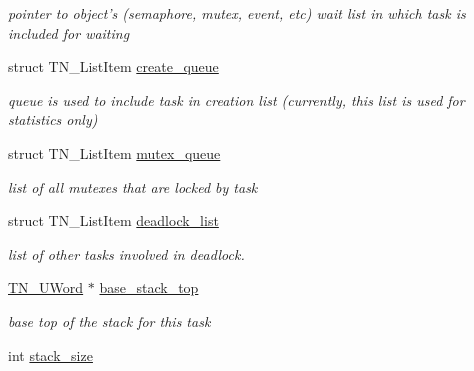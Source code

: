 \begin{DoxyCompactItemize}
\begin{DoxyCompactList}\small\item\em pointer to object's (semaphore, mutex, event, etc) wait list in which task is included for waiting \end{DoxyCompactList}\item 
\hypertarget{structTN__Task_aedb23df723d259530f10a122fec42334}{struct T\+N\+\_\+\+List\+Item \hyperlink{structTN__Task_aedb23df723d259530f10a122fec42334}{create\+\_\+queue}}\label{structTN__Task_aedb23df723d259530f10a122fec42334}

\begin{DoxyCompactList}\small\item\em queue is used to include task in creation list (currently, this list is used for statistics only) \end{DoxyCompactList}\item 
\hypertarget{structTN__Task_ad4decd7355c95a5b60a6774c3ee19eb9}{struct T\+N\+\_\+\+List\+Item \hyperlink{structTN__Task_ad4decd7355c95a5b60a6774c3ee19eb9}{mutex\+\_\+queue}}\label{structTN__Task_ad4decd7355c95a5b60a6774c3ee19eb9}

\begin{DoxyCompactList}\small\item\em list of all mutexes that are locked by task \end{DoxyCompactList}\item 
struct T\+N\+\_\+\+List\+Item \hyperlink{structTN__Task_a097e79851e01fb3c73f0346d99ea8b7e}{deadlock\+\_\+list}
\begin{DoxyCompactList}\small\item\em list of other tasks involved in deadlock. \end{DoxyCompactList}\item 
\hypertarget{structTN__Task_ab617b455f497c1bf497208e5afb8cc77}{\hyperlink{tn__arch__example_8h_ab80cba0fe9ffcd9011d53dfeb9e39bf4}{T\+N\+\_\+\+U\+Word} $\ast$ \hyperlink{structTN__Task_ab617b455f497c1bf497208e5afb8cc77}{base\+\_\+stack\+\_\+top}}\label{structTN__Task_ab617b455f497c1bf497208e5afb8cc77}

\begin{DoxyCompactList}\small\item\em base top of the stack for this task \end{DoxyCompactList}\item 
\hypertarget{structTN__Task_a18bd724533974648a39e965d10af83cb}{int \hyperlink{structTN__Task_a18bd724533974648a39e965d10af83cb}{stack\+\_\+size}}\label{structTN__Task_a18bd724533974648a39e965d10af83cb}


\end{DoxyCompactItemize}
